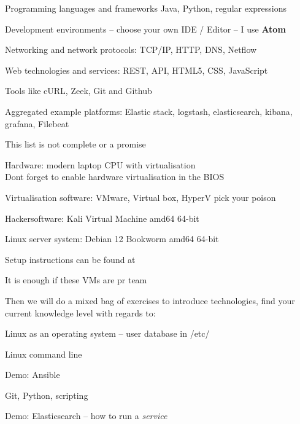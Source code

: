 \documentclass[Screen16to9,17pt]{foils}
\begin{document}
\begin{list2}
\item Programming languages and frameworks Java, Python, regular expressions
\item Development environments -- choose your own IDE / Editor -- I use {\bf Atom}
\item Networking and network protocols: TCP/IP, HTTP, DNS, Netflow
\item Web technologies and services: REST, API, HTML5, CSS, JavaScript
\item Tools like cURL, Zeek, Git and Github
\item Aggregated example platforms: Elastic stack, logstash, elasticsearch, kibana, grafana, Filebeat
\end{list2}

\centerline{This list is not complete or a promise }




\begin{list2}
\item Hardware: modern laptop CPU with virtualisation\\
Dont forget to enable hardware virtualisation in the BIOS
\item Virtualisation software: VMware, Virtual box, HyperV pick your poison
\item Hackersoftware: Kali Virtual Machine amd64 64-bit 
\item Linux server system: Debian 12 Bookworm amd64 64-bit 
\item Setup instructions can be found at 
\end{list2}

\centerline{It is enough if these VMs are pr team}

Then we will do a mixed bag of exercises to introduce technologies, find your current knowledge level with regards to:

\begin{list2}
\item Linux as an operating system -- user database in /etc/
\item Linux command line
\item Demo: Ansible
\item Git, Python, scripting
\item Demo: Elasticsearch -- how to run a \emph{service}
\end{list2}
\end{document}
